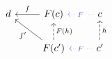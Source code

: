 \[\begin{tikzcd}
	d & {F(c)} & c \\
	& {F(c')} & {c'}
	\arrow["h"', dashed, from=2-3, to=1-3]
	\arrow["{F(h)}"', dashed, from=2-2, to=1-2]
	\arrow["{f'}", from=2-2, to=1-1]
	\arrow["f"', from=1-2, to=1-1]
	\arrow["F"{description}, color={rgb,255:red,92;green,92;blue,214}, dotted, from=1-3, to=1-2]
	\arrow["F"{description}, color={rgb,255:red,92;green,92;blue,214}, dotted, from=2-3, to=2-2]
\end{tikzcd}\]